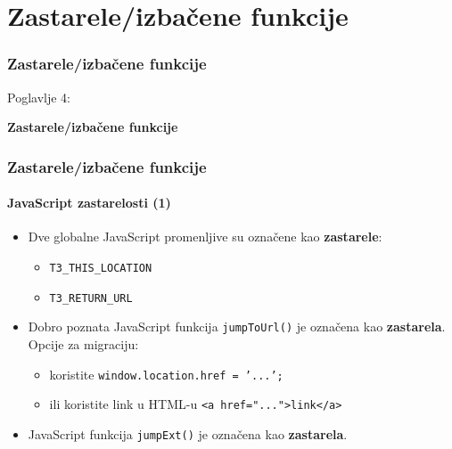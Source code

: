 %

\section{Zastarele/izbačene funkcije}
\begin{frame}[fragile]
	\frametitle{Zastarele/izbačene funkcije}

	\begin{center}\huge{Poglavlje 4:}\end{center}
	\begin{center}\huge{\color{typo3darkgrey}\textbf{Zastarele/izbačene funkcije}}\end{center}

\end{frame}


\begin{frame}[fragile]
	\frametitle{Zastarele/izbačene funkcije}
	\framesubtitle{JavaScript zastarelosti (1)}

	\begin{itemize}
		\item Dve globalne JavaScript promenljive su označene kao \textbf{zastarele}:

			\begin{itemize}
				\item \texttt{T3\_THIS\_LOCATION}
				\item \texttt{T3\_RETURN\_URL}
			\end{itemize}

		\item Dobro poznata JavaScript funkcija \texttt{jumpToUrl()} je označena kao \textbf{zastarela}.
			Opcije za migraciju:

			\begin{itemize}
				\item koristite \texttt{window.location.href = '...';}
				\item ili koristite link u HTML-u \texttt{<a href="...">link</a>}
			\end{itemize}

		\item JavaScript funkcija \texttt{jumpExt()} je označena kao \textbf{zastarela}.

	\end{itemize}

\end{frame}


